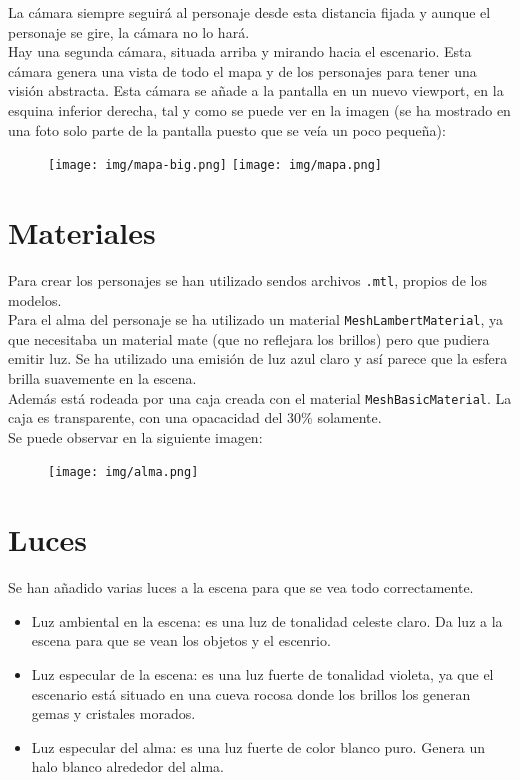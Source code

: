 \documentclass[11pt,a4paper]{article}
\begin{document}
La cámara siempre seguirá al personaje desde esta distancia fijada y aunque el personaje se gire, la cámara no lo hará. \\

Hay una segunda cámara, situada arriba y mirando hacia el escenario. Esta cámara genera una vista de todo el mapa y de los personajes para tener una visión abstracta. Esta cámara se añade a la pantalla en un nuevo viewport, en la esquina inferior derecha, tal y como se puede ver en la imagen (se ha mostrado en una foto solo parte de la pantalla puesto que se veía un poco pequeña):

\begin{figure}[H]
	\centering
	\texttt{[image: img/mapa-big.png]}
	\texttt{[image: img/mapa.png]}
\end{figure}

\section{Materiales}

Para crear los personajes se han utilizado sendos archivos \texttt{.mtl}, propios de los modelos.\\

Para el alma del personaje se ha utilizado un material \texttt{MeshLambertMaterial}, ya que necesitaba un material mate (que no reflejara los brillos) pero que pudiera emitir luz. Se ha utilizado una emisión de luz azul claro y así parece que la esfera brilla suavemente en la escena.\\

Además está rodeada por una caja creada con el material \texttt{MeshBasicMaterial}. La caja es transparente, con una opacacidad del 30\% solamente.\\

Se puede observar en la siguiente imagen:

\begin{figure}[H]
	\centering
	\texttt{[image: img/alma.png]}
\end{figure}

\section{Luces}

Se han añadido varias luces a la escena para que se vea todo correctamente.

\begin{itemize}
	\item Luz ambiental en la escena: es una luz de tonalidad celeste claro. Da luz a la escena para que se vean los objetos y el escenrio.
	\item Luz especular de la escena: es una luz fuerte de tonalidad violeta, ya que el escenario está situado en una cueva rocosa donde los brillos los generan gemas y cristales morados.
	\item Luz especular del alma: es una luz fuerte de color blanco puro. Genera un halo blanco alrededor del alma.
\end{itemize}
\end{document}
